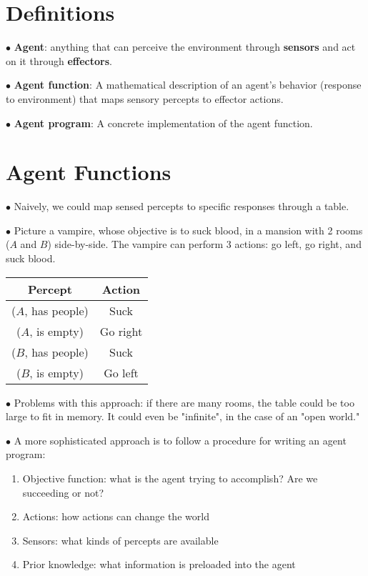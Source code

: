 \documentclass[english,openany]{book}
\begin{document}
    \section{Definitions}

    $\bullet$ \textbf{Agent}: anything that can perceive the environment through \textbf{sensors} and act on it through \textbf{effectors}.

    $\bullet$ \textbf{Agent function}: A mathematical description of an agent's behavior (response to environment) that maps sensory percepts to effector actions.

    $\bullet$ \textbf{Agent program}: A concrete implementation of the agent function.

    \section{Agent Functions}

    $\bullet$ Naively, we could map sensed percepts to specific responses through a table.

    $\bullet$ Picture a vampire, whose objective is to suck blood, in a mansion with 2 rooms ($A$ and $B$) side-by-side. The vampire can perform 3 actions: go left, go right, and suck blood.

    \begin{tabular}{|c|c|}
        \hline
        Percept & Action\\
        \hline
        ($A$, has people) & Suck\\
        ($A$, is empty) & Go right\\
        ($B$, has people) & Suck\\
        ($B$, is empty) & Go left\\
        \hline
    \end{tabular}

    $\bullet$ Problems with this approach: if there are many rooms, the table could be too large to fit in memory. It could even be "infinite", in the case of an "open world."

    $\bullet$ A more sophisticated approach is to follow a procedure for writing an agent program:

    \begin{enumerate}
        \item Objective function: what is the agent trying to accomplish? Are we succeeding or not?
        \item Actions: how actions can change the world
        \item Sensors: what kinds of percepts are available
        \item Prior knowledge: what information is preloaded into the agent
    \end{enumerate}
\end{document}
